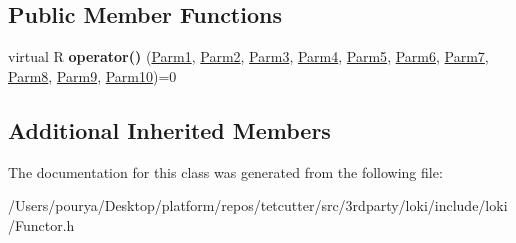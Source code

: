 \subsection*{Public Member Functions}
\begin{DoxyCompactItemize}
\item 
\hypertarget{classLoki_1_1FunctorImpl_3_01R_00_01LOKI__TYPELIST__10_07P1_00_01P2_00_01P3_00_01P4_00_01P5_00_0411efd7e1763d854e78c97db5e851b87_a151de1085edbb7d0be0fb4b7a8233ded}{}virtual R {\bfseries operator()} (\hyperlink{classLoki_1_1EmptyType}{Parm1}, \hyperlink{classLoki_1_1EmptyType}{Parm2}, \hyperlink{classLoki_1_1EmptyType}{Parm3}, \hyperlink{classLoki_1_1EmptyType}{Parm4}, \hyperlink{classLoki_1_1EmptyType}{Parm5}, \hyperlink{classLoki_1_1EmptyType}{Parm6}, \hyperlink{classLoki_1_1EmptyType}{Parm7}, \hyperlink{classLoki_1_1EmptyType}{Parm8}, \hyperlink{classLoki_1_1EmptyType}{Parm9}, \hyperlink{classLoki_1_1EmptyType}{Parm10})=0\label{classLoki_1_1FunctorImpl_3_01R_00_01LOKI__TYPELIST__10_07P1_00_01P2_00_01P3_00_01P4_00_01P5_00_0411efd7e1763d854e78c97db5e851b87_a151de1085edbb7d0be0fb4b7a8233ded}

\end{DoxyCompactItemize}
\subsection*{Additional Inherited Members}


The documentation for this class was generated from the following file\+:\begin{DoxyCompactItemize}
\item 
/\+Users/pourya/\+Desktop/platform/repos/tetcutter/src/3rdparty/loki/include/loki/Functor.\+h\end{DoxyCompactItemize}
